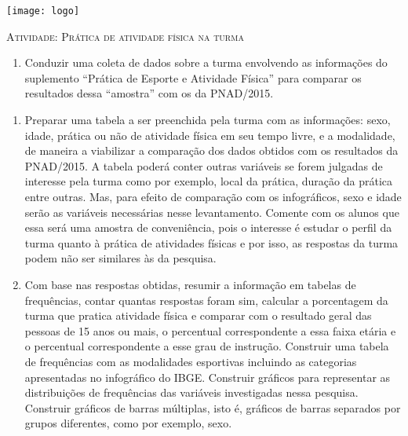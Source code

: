 \documentclass[10 pt,usenames,dvipsnames, oneside]{article}
\begin{document}
\begin{center}
  \begin{minipage}[l]{3cm}
\texttt{[image: logo]}    
\end{minipage}\hfill
\begin{minipage}[r]{.8\textwidth}
 {\Large \scshape Atividade: Prática de atividade física na turma}  
\end{minipage}
\end{center}
\vspace{.2cm}

\ifdefined\prof
\begin{objetivos}
\item 
\end{objetivos}

\begin{goals}
\begin{enumerate}
\item Conduzir uma coleta de dados sobre a turma envolvendo as informações do suplemento “Prática de Esporte e Atividade Física” para comparar os resultados dessa “amostra” com os da PNAD/2015.

\end{enumerate}

\tcblower
\begin{enumerate}
\item Preparar uma tabela a ser preenchida pela turma com as informações: sexo, idade, prática ou não de atividade física em seu tempo livre, e a modalidade, de maneira a viabilizar a comparação dos dados obtidos com os resultados da PNAD/2015. A tabela poderá conter outras variáveis se forem julgadas de interesse pela turma como por exemplo, local da prática, duração da prática entre outras. Mas, para efeito de comparação com os infográficos, sexo e idade serão as variáveis necessárias nesse levantamento. Comente com os alunos que essa será uma amostra de conveniência, pois o interesse é estudar o perfil da turma quanto à prática de atividades físicas e por isso, as respostas da turma podem não ser similares às da pesquisa.

\item Com base nas respostas obtidas, resumir a informação em tabelas de frequências, contar quantas respostas foram sim, calcular a porcentagem da turma que pratica atividade física e comparar com o resultado geral das pessoas de 15 anos ou mais, o percentual correspondente a essa faixa etária e o percentual correspondente a esse grau de instrução. Construir uma tabela de frequências com as modalidades esportivas incluindo as categorias apresentadas no infográfico do IBGE. Construir gráficos para representar as distribuições de frequências das variáveis investigadas nessa pesquisa. Construir gráficos de barras múltiplas, isto é, gráficos de barras separados por grupos diferentes, como por exemplo, sexo.
\end{enumerate}

\end{goals}
\end{document}
